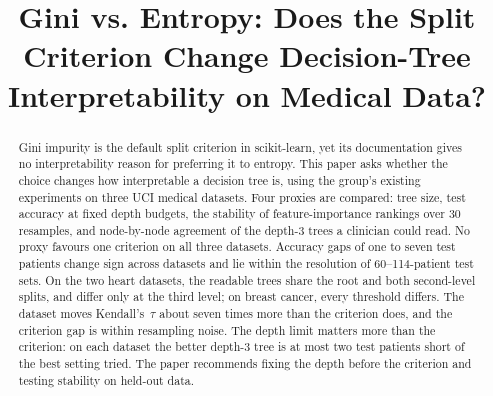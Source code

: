 \documentclass[conference,10pt]{IEEEtran}
\begin{document}
\title{Gini vs. Entropy: Does the Split Criterion Change Decision-Tree Interpretability on Medical Data?}

\author{
\and
{}
\and
{}
\and
{}
}

\maketitle

\begin{abstract}
Gini impurity is the default split criterion in scikit-learn, yet its documentation gives no interpretability reason for preferring it to entropy. This paper asks whether the choice changes how interpretable a decision tree is, using the group's existing experiments on three UCI medical datasets. Four proxies are compared: tree size, test accuracy at fixed depth budgets, the stability of feature-importance rankings over 30 resamples, and node-by-node agreement of the depth-3 trees a clinician could read. No proxy favours one criterion on all three datasets. Accuracy gaps of one to seven test patients change sign across datasets and lie within the resolution of 60--114-patient test sets. On the two heart datasets, the readable trees share the root and both second-level splits, and differ only at the third level; on breast cancer, every threshold differs. The dataset moves Kendall's~$\tau$ about seven times more than the criterion does, and the criterion gap is within resampling noise. The depth limit matters more than the criterion: on each dataset the better depth-3 tree is at most two test patients short of the best setting tried. The paper recommends fixing the depth before the criterion and testing stability on held-out data.
\end{abstract}
\end{document}
